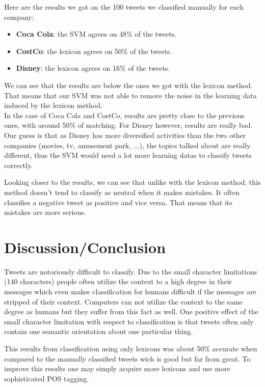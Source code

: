 \documentclass[a4paper,12pt]{report}
\begin{document}
Here are the results we got on the 100 tweets we classified manually for each company:
\begin{itemize}
        \item \textbf{Coca Cola}: the SVM agrees on 48\% of the tweets.
        \item \textbf{CostCo}: the lexicon agrees on 50\% of the tweets.
        \item \textbf{Disney}: the lexicon agrees on 16\% of the tweets.
\end{itemize}
We can see that the results are below the ones we got with the lexicon method.
That means that our SVM was not able to remove the noise in the learning data induced by the lexicon method.\\
In the case of Coca Cola and CostCo, results are pretty close to the previous ones, with around 50\% of matching.
For Disney however, results are really bad. Our guess  is that as Disney has more diversified activities than the two other companies (movies, tv, amusement park, ...), the topics talked about are really different, thus the SVM would need a lot more learning datas to classify tweets correctly.

Looking closer to the results, we can see that unlike with the lexicon method, this method doesn't tend to classify as neutral when it makes mistakes.
It often classifies a negative tweet as positive and vice versa.
That means that its mistakes are more serious.

\chapter{Discussion/Conclusion}
Tweets are notoriously difficult to classify. Due to the small character limitations (140 characters) people often utilize the context to a high degree in their messages which even makes classification for humans difficult if the messages are stripped of their context. Computers can not utilize the context to the same degree as humans but they suffer from this fact as well. One positive effect of the small character limitation with respect to classification is that tweets often only contain one semantic orientation about one particular thing.

This results from classification using only lexicons was about 50\% accurate when compared to the manually classified tweets wich is good but far from great. To improve this results one may simply acquire more lexicons and use more sophisticated POS tagging. 
\end{document}
